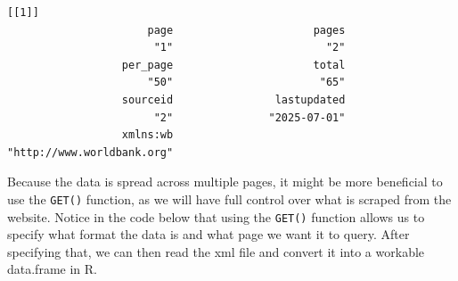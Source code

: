 \documentclass[
  letterpaper,
  DIV=11,
  numbers=noendperiod]{scrreprt}
\begin{document}
\begin{verbatim}
[[1]]
                      page                      pages 
                       "1"                        "2" 
                  per_page                      total 
                      "50"                       "65" 
                  sourceid                lastupdated 
                       "2"               "2025-07-01" 
                  xmlns:wb 
"http://www.worldbank.org" 
\end{verbatim}

Because the data is spread across multiple pages, it might be more
beneficial to use the \texttt{GET()} function, as we will have full
control over what is scraped from the website. Notice in the code below
that using the \texttt{GET()} function allows us to specify what format
the data is and what page we want it to query. After specifying that, we
can then read the xml file and convert it into a workable data.frame in
R.
\end{document}
